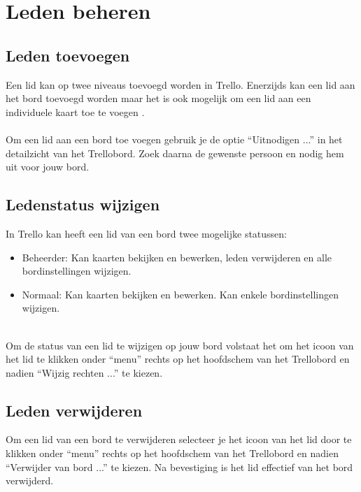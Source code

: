 \chapter{Leden beheren}\label{chapter:leden_beheren}

\section{Leden toevoegen}

Een lid kan op twee niveaus toevoegd worden in Trello. Enerzijds kan een lid aan het bord toevoegd worden maar het is ook mogelijk om een lid aan een individuele kaart toe te voegen . 
\noindent
\\\\Om een lid aan een bord toe voegen gebruik je de optie ``Uitnodigen ...'' in het detailzicht van het Trellobord. Zoek daarna de gewenste persoon en nodig hem uit voor jouw bord.

\section{Ledenstatus wijzigen}

In Trello kan heeft een lid van een bord twee mogelijke statussen:
\begin{itemize}
	\item Beheerder: Kan kaarten bekijken en bewerken, leden verwijderen en alle bordinstellingen wijzigen.
	\item Normaal: Kan kaarten bekijken en bewerken. Kan enkele bordinstellingen wijzigen.
\end{itemize}
\noindent
\\Om de status van een lid te wijzigen op jouw bord volstaat het om het icoon van het lid te klikken onder ``menu'' rechts op het hoofdschem van het Trellobord en nadien ``Wijzig rechten ...'' te kiezen.

\section{Leden verwijderen}

Om een lid van een bord te verwijderen selecteer je het icoon van het lid door te klikken onder ``menu'' rechts op het hoofdschem van het Trellobord en nadien ``Verwijder van bord ...'' te kiezen. Na bevestiging is het lid effectief van het bord verwijderd.